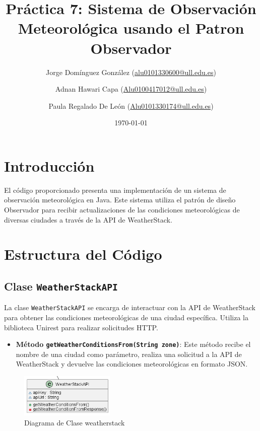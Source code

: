 \documentclass{article}
\title{\Huge \textbf{Práctica 7: Sistema de Observación Meteorológica usando el Patron Observador}}
\author{
  Jorge Domínguez González (\href{mailto:alu0101330600@ull.edu.es}{alu0101330600@ull.edu.es}) \and
  Adnan Hawari Capa (\href{mailto:Alu0100417012@ull.edu.es}{Alu0100417012@ull.edu.es}) \and
  Paula Regalado De León (\href{mailto:Alu0101330174@ull.edu.es}{Alu0101330174@ull.edu.es})
}
\date{\today}
\begin{document}
\maketitle

\tableofcontents
\listoffigures
\newpage

\section{Introducción}
El código proporcionado presenta una implementación de un sistema de observación meteorológica en Java. Este sistema utiliza el patrón de diseño Observador para recibir actualizaciones de las condiciones meteorológicas de diversas ciudades a través de la API de WeatherStack.

\section{Estructura del Código}

\subsection{Clase \texttt{WeatherStackAPI}}
La clase \texttt{WeatherStackAPI} se encarga de interactuar con la API de WeatherStack para obtener las condiciones meteorológicas de una ciudad específica. Utiliza la biblioteca Unirest para realizar solicitudes HTTP.

\begin{itemize}
    \item \textbf{Método \texttt{getWeatherConditionsFrom(String zone)}}: Este método recibe el nombre de una ciudad como parámetro, realiza una solicitud a la API de WeatherStack y devuelve las condiciones meteorológicas en formato JSON.
\end{itemize}

\begin{figure}[H]
    \centering
    \includegraphics[width=0.4\textwidth]{weatherstack.png}
    \caption{Diagrama de Clase weatherstack}
    \label{figura:weatherstack}
\end{figure}
\end{document}
